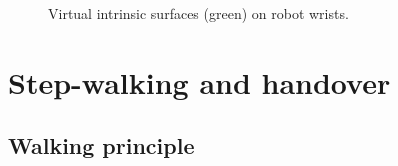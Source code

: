 \documentclass[a4paper, 12pt, oneside]{Thesis}  %
\begin{document}
\begin{figure}[ht]
	\caption{Virtual intrinsic surfaces (green) on robot wrists.}
	\label{fig:wrist-surface}
\end{figure}

%
%






\clearpage

\section{Step-walking and handover}

\subsection{Walking principle}

%
%
\end{document}
